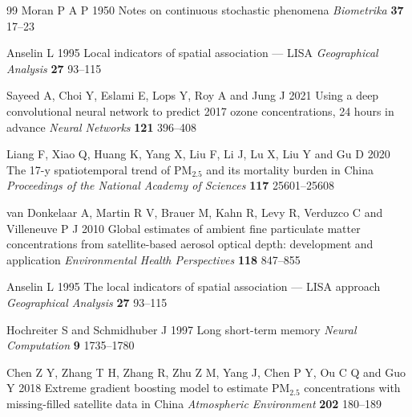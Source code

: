 \documentclass{iopjournal}
\begin{document}
\begin{thebibliography}{99}
Moran P A P 1950 Notes on continuous stochastic phenomena
\textit{Biometrika} \textbf{37} 17--23

Anselin L 1995 Local indicators of spatial association --- LISA
\textit{Geographical Analysis} \textbf{27} 93--115

Sayeed A, Choi Y, Eslami E, Lops Y, Roy A and Jung J 2021 Using a
deep convolutional neural network to predict 2017 ozone
concentrations, 24 hours in advance \textit{Neural Networks}
\textbf{121} 396--408

Liang F, Xiao Q, Huang K, Yang X, Liu F, Li J, Lu X, Liu Y and Gu D
2020 The 17-y spatiotemporal trend of PM$_{2.5}$ and its
mortality burden in China \textit{Proceedings of the National
Academy of Sciences} \textbf{117} 25601--25608

van Donkelaar A, Martin R V, Brauer M, Kahn R, Levy R, Verduzco C
and Villeneuve P J 2010 Global estimates of ambient fine particulate
matter concentrations from satellite-based aerosol optical depth:
development and application \textit{Environmental Health
Perspectives} \textbf{118} 847--855

Anselin L 1995 The local indicators of spatial association ---
LISA approach \textit{Geographical Analysis} \textbf{27} 93--115

Hochreiter S and Schmidhuber J 1997 Long short-term memory
\textit{Neural Computation} \textbf{9} 1735--1780

Chen Z Y, Zhang T H, Zhang R, Zhu Z M, Yang J, Chen P Y, Ou C Q
and Guo Y 2018 Extreme gradient boosting model to estimate
PM$_{2.5}$ concentrations with missing-filled satellite data in
China \textit{Atmospheric Environment} \textbf{202} 180--189

\end{thebibliography}
\end{document}
